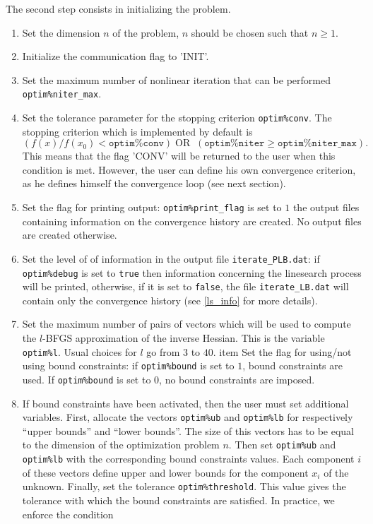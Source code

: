\documentclass[a4paper,twoside,final,onecolumn,11pt,openright]{article}
\begin{document}
The second step consists in initializing the problem.
\begin{enumerate}
 \item Set the dimension $n$ of the problem, $n$ should be chosen such that $n\geq1$.
 \item Initialize the communication flag to 'INIT'.
 \item Set the maximum number of nonlinear iteration that can be performed \texttt{optim\%niter\_max}.
 \item Set the tolerance parameter for the stopping criterion \texttt{optim\%conv}. The stopping criterion which is implemented by default is 
\begin{equation}
 \left(f(x)/f(x_0)< \texttt{optim\%conv}\right) \; \textrm{OR} \;\;  \left(\texttt{optim\%niter}\geq\texttt{optim\%niter\_max}\right).
\end{equation}
This means that the flag 'CONV' will be returned to the user when this condition is met. However, the user can define his own convergence criterion, as he defines himself the convergence loop (see next section). 
\item  Set the flag for printing output: \texttt{optim\%print\_flag} is set to $1$ the output files containing information on the convergence history are created. No output files are created otherwise.
 \item Set the level of of information in the output file \texttt{iterate\_PLB.dat}: if \texttt{optim\%debug} is set to \texttt{true} then information concerning the linesearch process will be printed, otherwise, if it is set to \texttt{false}, the file \texttt{iterate\_LB.dat} will contain only the convergence history (see \ref{ls_info} for more details).
\item Set the maximum number of pairs of vectors which will be used to compute the $l$-BFGS approximation of the inverse Hessian. This is the variable \texttt{optim\%l}. Usual choices for $l$ go from $3$ to $40$. 
item Set the flag for using/not using bound constraints: if \texttt{optim\%bound} is set to $1$, bound constraints are used. If  \texttt{optim\%bound} is set to $0$, no bound constraints are imposed.
\item If bound constraints have been activated, then the user must set additional variables. First, allocate the vectors \texttt{optim\%ub} and \texttt{optim\%lb} for respectively ``upper bounds'' and ``lower bounds''. The size of this vectors has to be equal to the dimension of the optimization problem $n$. Then set \texttt{optim\%ub} and \texttt{optim\%lb} with the corresponding bound constraints values. Each component $i$ of these vectors define upper and lower bounds for the component $x_i$ of the unknown. Finally, set the tolerance \texttt{optim\%threshold}. This value gives the tolerance with which the bound constraints are satisfied. In practice, we enforce the condition

\end{enumerate}
\end{document}
